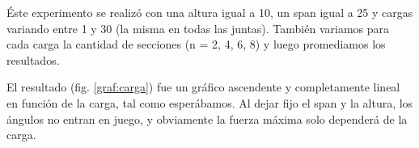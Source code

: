 \'Este experimento se realiz\'o con una altura igual a 10, un span igual a 25 y cargas variando entre 1 y 30 (la misma en todas las juntas). 
Tambi\'en variamos para cada carga la cantidad de secciones (n = 2, 4, 6, 8) y luego promediamos los resultados. 

El resultado (fig. \ref{graf:carga}) fue un gr\'afico ascendente y completamente lineal en funci\'on de la carga, tal como esper\'abamos.
Al dejar fijo el span y la altura, los \'angulos no entran en juego, y obviamente la fuerza m\'axima solo depender\'a de la carga.